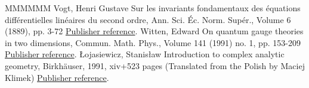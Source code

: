 \begin{thebibliography}{MMMMMM}
 Vogt, Henri Gustave Sur les invariants fondamentaux des équations différentielles linéaires du second ordre, Ann. Sci. Éc. Norm. Supér., Volume 6 (1889), pp. 3-72 \href{https://ahl.centre-mersenne.org/item/AHL_2020__3__341_0/#Vogt}{Publisher reference}.
 Witten, Edward On quantum gauge theories in two dimensions, Commun. Math. Phys., Volume 141 (1991) no. 1, pp. 153-209 \href{https://ahl.centre-mersenne.org/item/AHL_2020__3__341_0/#Witten}{Publisher reference}.
 Łojasiewicz, Stanisław Introduction to complex analytic geometry, Birkhäuser, 1991, xiv+523 pages (Translated from the Polish by Maciej Klimek) \href{https://ahl.centre-mersenne.org/item/AHL_2020__3__341_0/#Loj}{Publisher reference}.
\end{thebibliography}
